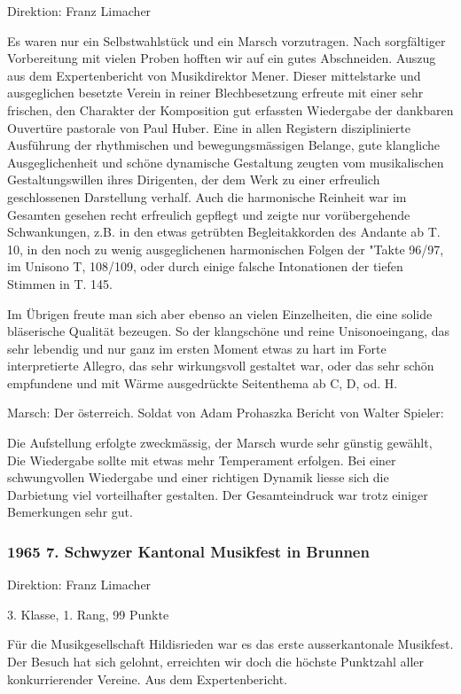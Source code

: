 \begin{history}
    Direktion: Franz Limacher

    Es waren nur ein Selbstwahlstück und ein Marsch vorzutragen. Nach
    sorgfältiger Vorbereitung mit vielen Proben hofften wir auf ein gutes
    Abschneiden. Auszug aus dem Expertenbericht von Musikdirektor Mener. Dieser
    mittelstarke und ausgeglichen besetzte Verein in reiner Blechbesetzung
    erfreute mit einer sehr frischen, den Charakter der Komposition gut
    erfassten Wiedergabe der dankbaren Ouvertüre pastorale von Paul Huber. Eine
    in allen Registern disziplinierte Ausführung der rhythmischen und
    bewegungsmässigen Belange, gute klangliche Ausgeglichenheit und schöne
    dynamische Gestaltung zeugten vom musikalischen Gestaltungswillen ihres
    Dirigenten, der dem Werk zu einer erfreulich geschlossenen Darstellung
    verhalf. Auch die harmonische Reinheit war im Gesamten gesehen recht
    erfreulich gepflegt und zeigte nur vorübergehende Schwankungen, z.B. in den
    etwas getrübten Begleitakkorden des Andante ab T. 10, in den noch zu wenig
    ausgeglichenen harmonischen Folgen der "Takte 96/97, im Unisono T, 108/109,
    oder durch einige falsche Intonationen der tiefen Stimmen in T. 145.

    Im Übrigen freute man sich aber ebenso an vielen Einzelheiten, die eine
    solide bläserische Qualität bezeugen. So der klangschöne und reine
    Unisonoeingang, das sehr lebendig und nur ganz im ersten Moment etwas zu
    hart im Forte interpretierte Allegro, das sehr wirkungsvoll gestaltet war,
    oder das sehr schön empfundene und mit Wärme ausgedrückte Seitenthema ab C,
    D, od. H.

    Marsch: Der österreich. Soldat von Adam Prohaszka Bericht von Walter
    Spieler:

    Die Aufstellung erfolgte zweckmässig, der Marsch wurde sehr günstig gewählt,
    Die Wiedergabe sollte mit etwas mehr Temperament erfolgen. Bei einer
    schwungvollen Wiedergabe und einer richtigen Dynamik liesse sich die
    Darbietung viel vorteilhafter gestalten. Der Gesamteindruck war trotz
    einiger Bemerkungen sehr gut.

    \subsubsection{1965 7. Schwyzer Kantonal Musikfest in Brunnen}

    Direktion: Franz Limacher

    3. Klasse, 1. Rang, 99 Punkte

    Für die Musikgesellschaft Hildisrieden war es das erste ausserkantonale
    Musikfest. Der Besuch hat sich gelohnt, erreichten wir doch die höchste
    Punktzahl aller konkurrierender Vereine. Aus dem Expertenbericht.


\end{history}
